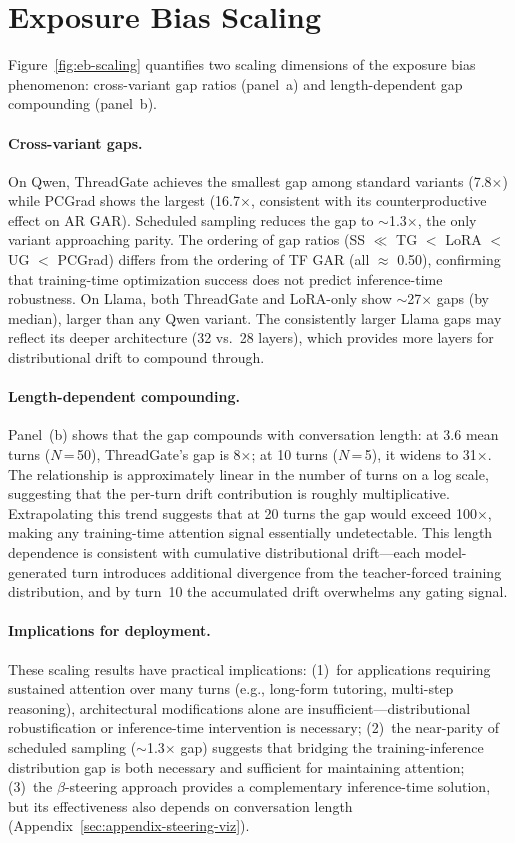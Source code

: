 \section{Exposure Bias Scaling}\label{sec:appendix-eb-scaling}

Figure~\ref{fig:eb-scaling} quantifies two scaling dimensions of the exposure bias phenomenon: cross-variant gap ratios (panel~a) and length-dependent gap compounding (panel~b).

\paragraph{Cross-variant gaps.} On Qwen, ThreadGate achieves the smallest gap among standard variants (7.8$\times$) while PCGrad shows the largest (16.7$\times$, consistent with its counterproductive effect on AR GAR). Scheduled sampling reduces the gap to ${\sim}$1.3$\times$, the only variant approaching parity. The ordering of gap ratios (SS $\ll$ TG $<$ LoRA $<$ UG $<$ PCGrad) differs from the ordering of TF GAR (all $\approx$ 0.50), confirming that training-time optimization success does not predict inference-time robustness. On Llama, both ThreadGate and LoRA-only show $\sim$27$\times$ gaps (by median), larger than any Qwen variant. The consistently larger Llama gaps may reflect its deeper architecture (32 vs.\ 28 layers), which provides more layers for distributional drift to compound through.

\paragraph{Length-dependent compounding.} Panel~(b) shows that the gap compounds with conversation length: at 3.6 mean turns ($N$\,=\,50), ThreadGate's gap is 8$\times$; at 10 turns ($N$\,=\,5), it widens to 31$\times$. The relationship is approximately linear in the number of turns on a log scale, suggesting that the per-turn drift contribution is roughly multiplicative. Extrapolating this trend suggests that at 20 turns the gap would exceed 100$\times$, making any training-time attention signal essentially undetectable. This length dependence is consistent with cumulative distributional drift---each model-generated turn introduces additional divergence from the teacher-forced training distribution, and by turn~10 the accumulated drift overwhelms any gating signal.

\paragraph{Implications for deployment.} These scaling results have practical implications: (1)~for applications requiring sustained attention over many turns (e.g., long-form tutoring, multi-step reasoning), architectural modifications alone are insufficient---distributional robustification or inference-time intervention is necessary; (2)~the near-parity of scheduled sampling (${\sim}$1.3$\times$ gap) suggests that bridging the training-inference distribution gap is both necessary and sufficient for maintaining attention; (3)~the $\beta$-steering approach provides a complementary inference-time solution, but its effectiveness also depends on conversation length (Appendix~\ref{sec:appendix-steering-viz}).

